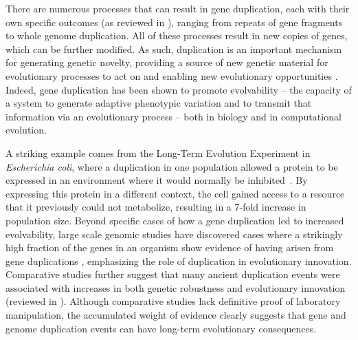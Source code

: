 There are numerous processes that can result in gene duplication, each with their own specific outcomes (as reviewed in \citep{Zhang:2003fw}), ranging from repeats of gene fragments to whole genome duplication. All of these processes result in %
new copies of genes, which can be further modified.
As such, duplication is an important mechanism for generating genetic novelty, providing a source of new genetic material for evolutionary processes to act on and enabling new evolutionary opportunities \citep{Zhang:2003fw,Crow:2006role,Magadum:2013wu}. Indeed, gene duplication has been shown to promote evolvability -- the capacity of a system to generate adaptive phenotypic variation %
and to transmit that information via an evolutionary process \citep{Hu:2010ea} -- both in biology and in computational evolution.  %

A striking example comes from the Long-Term Evolution Experiment in \textit{Escherichia coli}, where a duplication in one population allowed a protein to be expressed in an environment where it would normally be inhibited~\citep{blount_genomic_2012}.  By expressing this protein in a different context, the cell gained access to a resource that it previously could not metabolize, resulting in a 7-fold increase in population size. %
Beyond specific cases of how a gene duplication led to increased evolvability, large scale genomic studies have discovered cases where a strikingly high fraction of the genes in an organism show evidence of having arisen from gene duplications \citep{teichmann_structural_1998,Teichmann:2004cz}, emphasizing the role of duplication in evolutionary innovation.  Comparative studies further suggest that many ancient duplication events were associated with increases in both genetic robustness and evolutionary innovation (reviewed in \citep{wagner_gene_2008}).  Although comparative studies lack definitive proof of laboratory manipulation, the accumulated weight of evidence clearly suggests that gene and genome duplication events can have long-term evolutionary consequences.

